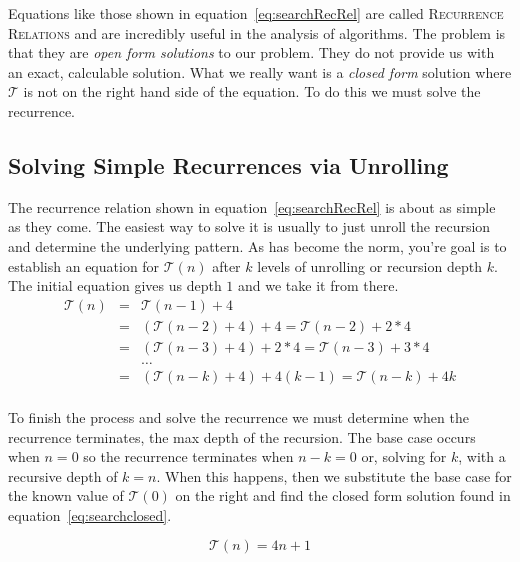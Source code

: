 \documentclass[nobib]{tufte-handout}
\begin{document}
Equations like those shown in equation~\ref{eq:searchRecRel} are called \textsc{Recurrence Relations} and are incredibly useful in the analysis of algorithms. The problem is that they are \textit{open form solutions} to our problem. They do not provide us with an exact, calculable solution. What we really want is a \textit{closed form} solution where $\mathcal{T}$ is not on the right hand side of the equation. To do this we must solve the recurrence.

\subsection{Solving Simple Recurrences via Unrolling}

The recurrence relation shown in equation~\ref{eq:searchRecRel} is about as simple as they come. The easiest way to solve it is usually to just unroll the recursion and determine the underlying pattern.  As has become the norm, you're goal is to establish an equation for $\mathcal{T}(n)$ after $k$ levels of unrolling or recursion depth $k$. The initial equation gives us depth $1$ and we take it from there.
\begin{equation*}
  \begin{array}{rcl}
    \mathcal{T}(n) &=& \mathcal{T}(n-1) + 4 \\
    &=& (\mathcal{T}(n-2) + 4) + 4 = \mathcal{T}(n-2) + 2*4 \\
    &=& (\mathcal{T}(n-3) + 4) + 2*4 = \mathcal{T}(n-3) + 3*4 \\
    & & \ldots \\
    &=& (\mathcal{T}(n-k) + 4) + 4(k-1) = \mathcal{T}(n-k) + 4k \\
  \end{array}
\end{equation*}

To finish the process and solve the recurrence we must determine when the recurrence terminates, the max depth of the recursion. The base case occurs when $n=0$ so the recurrence terminates when $n-k=0$ or, solving for $k$, with a recursive depth of $k=n$. When this happens, then we substitute the base case for the known value of  $\mathcal{T}(0)$ on the right and find the closed form solution found in equation~\ref{eq:searchclosed}.

\begin{equation}
\mathcal{T}(n) = 4n+1
\label{eq:searchclosed}
\end{equation}
\end{document}
